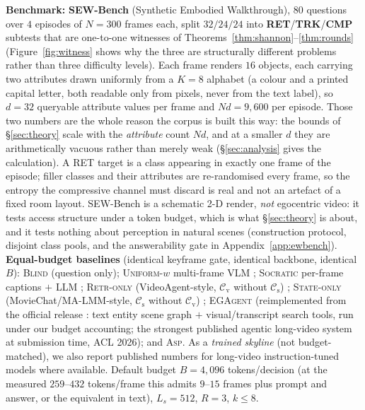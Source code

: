 \documentclass[10pt]{article}
\theoremstyle{definition}
\theoremstyle{plain}
\newcommand{\ASP}{\textsc{Asp}}
\newcommand{\cs}{\mathcal{C}_{\mathrm{s}}}
\newcommand{\cv}{\mathcal{C}_{\mathrm{v}}}
\begin{document}
\textbf{Benchmark:} \textbf{SEW-Bench} (Synthetic Embodied Walkthrough), $80$ questions over $4$ episodes of $N{=}300$ frames each, split $32/24/24$ into \textbf{RET}/\textbf{TRK}/\textbf{CMP} subtests that are one-to-one witnesses of Theorems~\ref{thm:shannon}--\ref{thm:rounds} (Figure~\ref{fig:witness} shows why the three are structurally different problems rather than three difficulty levels). Each frame renders $16$ objects, each carrying two attributes drawn uniformly from a $K{=}8$ alphabet (a colour and a printed capital letter, both readable only from pixels, never from the text label), so $d{=}32$ queryable attribute values per frame and $Nd{=}9{,}600$ per episode. Those two numbers are the whole reason the corpus is built this way: the bounds of \S\ref{sec:theory} scale with the \emph{attribute} count $Nd$, and at a smaller $d$ they are arithmetically vacuous rather than merely weak (\S\ref{sec:analysis} gives the calculation). A RET target is a class appearing in exactly one frame of the episode; filler classes and their attributes are re-randomised every frame, so the entropy the compressive channel must discard is real and not an artefact of a fixed room layout. SEW-Bench is a schematic 2-D render, \emph{not} egocentric video: it tests access structure under a token budget, which is what \S\ref{sec:theory} is about, and it tests nothing about perception in natural scenes (construction protocol, disjoint class pools, and the answerability gate in Appendix~\ref{app:ewbench}).
\textbf{Equal-budget baselines} (identical keyframe gate, identical backbone, identical $B$): \textsc{Blind} (question only); \textsc{Uniform-$w$} multi-frame VLM \citep{openeqa}; \textsc{Socratic} per-frame captions $+$ LLM \citep{socratic}; \textsc{Retr-only} (VideoAgent-style, $\cv$ without $\cs$) \citep{videoagent}; \textsc{State-only} (MovieChat/MA-LMM-style, $\cs$ without $\cv$) \citep{moviechat,malmm}; \textsc{EGAgent} (reimplemented from the official release \citep{egagent}: text entity scene graph $+$ visual/transcript search tools, run under our budget accounting; the strongest published agentic long-video system at submission time, ACL 2026); and \ASP{}. As a \emph{trained skyline} (not budget-matched), we also report published numbers for long-video instruction-tuned models \citep{longvitu} where available. Default budget $B{=}4{,}096$ tokens/decision (at the measured $259$--$432$ tokens/frame this admits $9$--$15$ frames plus prompt and answer, or the equivalent in text), $L_s{=}512$, $R{=}3$, $k{\le}8$.
\end{document}
